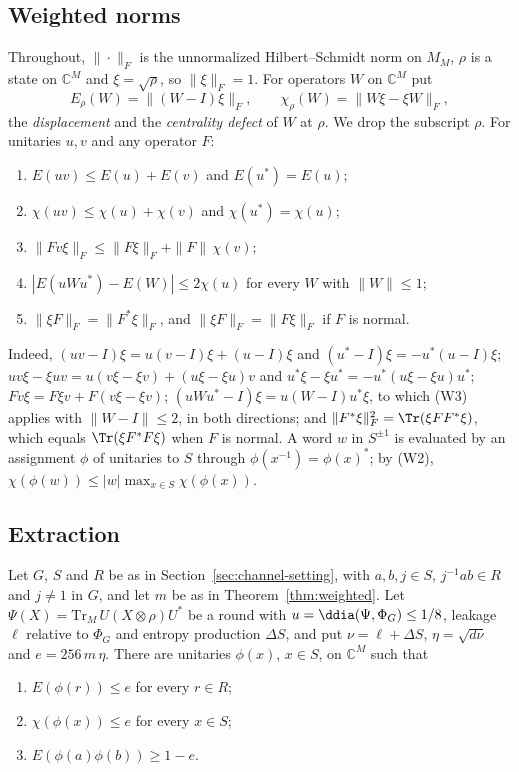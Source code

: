 \subsection{Weighted norms}

Throughout, $\|\cdot\|_F$ is the unnormalized Hilbert--Schmidt norm on $M_M$, $\rho$ is a state on $\mathbb C^M$ and $\xi=\sqrt\rho$, so
$\|\xi\|_F=1$. For operators $W$ on $\mathbb C^M$ put
\[
E_\rho(W)=\|(W-I)\xi\|_F,\qquad\chi_\rho(W)=\|W\xi-\xi W\|_F,
\]
the \emph{displacement} and the \emph{centrality defect} of $W$ at $\rho$. We drop the subscript $\rho$. For unitaries $u,v$ and any operator $F$:
\begin{enumerate}[label=(W\arabic*),itemsep=1pt]
\item $E(uv)\le E(u)+E(v)$ and $E(u^*)=E(u)$;
\item $\chi(uv)\le\chi(u)+\chi(v)$ and $\chi(u^*)=\chi(u)$;
\item $\|Fv\xi\|_F\le\|F\xi\|_F+\|F\|\,\chi(v)$;
\item $|E(uWu^*)-E(W)|\le2\chi(u)$ for every $W$ with $\|W\|\le1$;
\item $\|\xi F\|_F=\|F^*\xi\|_F$, and $\|\xi F\|_F=\|F\xi\|_F$ if $F$ is normal.
\end{enumerate}
Indeed, $(uv-I)\xi=u(v-I)\xi+(u-I)\xi$ and $(u^*-I)\xi=-u^*(u-I)\xi$; $uv\xi-\xi uv=u(v\xi-\xi v)+(u\xi-\xi u)v$ and
$u^*\xi-\xi u^*=-u^*(u\xi-\xi u)u^*$; $Fv\xi=F\xi v+F(v\xi-\xi v)$; $(uWu^*-I)\xi=u(W-I)u^*\xi$, to which (W3) applies with $\|W-I\|\le2$, in both
directions; and $\|F^*\xi\|_F^2=\Tr(\xi FF^*\xi)$, which equals $\Tr(\xi F^*F\xi)$ when $F$ is normal. A word $w$ in $S^{\pm1}$ is evaluated by an
assignment $\phi$ of unitaries to $S$ through $\phi(x^{-1})=\phi(x)^*$; by (W2), $\chi(\phi(w))\le|w|\max_{x\in S}\chi(\phi(x))$.

\subsection{Extraction}

\begin{lemma}\label{lem:weighted-extraction}
Let $G$, $S$ and $R$ be as in Section~\ref{sec:channel-setting}, with $a,b,j\in S$, $j^{-1}ab\in R$ and $j\ne1$ in $G$, and let $m$ be as in
Theorem~\ref{thm:weighted}. Let $\Psi(X)=\mathrm{Tr}_M\,U(X\otimes\rho)U^*$
be a round with $u=\ddia(\Psi,\Phi_G)\le1/8$, leakage $\ell$ relative to $\Phi_G$ and entropy production $\Delta S$, and put $\nu=\ell+\Delta S$,
$\eta=\sqrt{d\nu}$ and $e=256\,m\,\eta$. There are unitaries $\phi(x)$, $x\in S$, on $\mathbb C^M$ such that
\begin{enumerate}[label=(\roman*),itemsep=1pt]
\item $E(\phi(r))\le e$ for every $r\in R$;
\item $\chi(\phi(x))\le e$ for every $x\in S$;
\item $E(\phi(a)\phi(b))\ge1-e$.
\end{enumerate}
\end{lemma}

